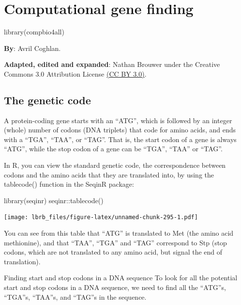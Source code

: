 \documentclass[
]{book}
\newenvironment{Shaded}{\begin{snugshade}}{\end{snugshade}}
\newcommand{\FunctionTok}[1]{\textcolor[rgb]{0.00,0.00,0.00}{#1}}
\newcommand{\NormalTok}[1]{#1}
\newcommand{\SpecialCharTok}[1]{\textcolor[rgb]{0.00,0.00,0.00}{#1}}
\begin{document}
\hypertarget{computational-gene-finding}{%
\chapter{Computational gene finding}\label{computational-gene-finding}}

\begin{Shaded}
\begin{Highlighting}[]
\FunctionTok{library}\NormalTok{(compbio4all)}
\end{Highlighting}
\end{Shaded}

\textbf{By}: Avril Coghlan.

\textbf{Adapted, edited and expanded}: Nathan Brouwer under the Creative Commons 3.0 Attribution License \href{https://creativecommons.org/licenses/by/3.0/}{(CC BY 3.0)}.

\hypertarget{the-genetic-code}{%
\section{The genetic code}\label{the-genetic-code}}

A protein-coding gene starts with an ``ATG'', which is followed by an integer (whole) number of codons (DNA triplets) that code for amino acids, and ends with a ``TGA'', ``TAA'', or ``TAG''. That is, the start codon of a gene is always ``ATG'', while the stop codon of a gene can be ``TGA'', ``TAA'' or ``TAG''.

In R, you can view the standard genetic code, the correspondence between codons and the amino acids that they are translated into, by using the tablecode() function in the SeqinR package:

\begin{Shaded}
\begin{Highlighting}[]
\FunctionTok{library}\NormalTok{(seqinr)}
\NormalTok{seqinr}\SpecialCharTok{::}\FunctionTok{tablecode}\NormalTok{()}
\end{Highlighting}
\end{Shaded}

\texttt{[image: lbrb\_files/figure-latex/unnamed-chunk-295-1.pdf]}

You can see from this table that ``ATG'' is translated to Met (the amino acid methionine), and that ``TAA'', ``TGA'' and ``TAG'' correspond to Stp (stop codons, which are not translated to any amino acid, but signal the end of translation).

Finding start and stop codons in a DNA sequence
To look for all the potential start and stop codons in a DNA sequence, we need to find all the ``ATG''s, ``TGA''s, ``TAA''s, and ``TAG''s in the sequence.
\end{document}
